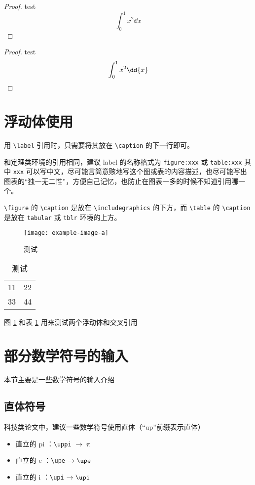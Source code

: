 \begin{proof}
  test
  \[
    \int_{0}^{1} x^2 \dd{x}
  \]
\end{proof}

\begin{proof}
  test
  \[
    \int_{0}^{1} x^2 \dd{x}  \qedhere
  \]
\end{proof}

\section{浮动体使用}

用 \verb|\label| 引用时，只需要将其放在 \verb|\caption| 的下一行即可。

和定理类环境的引用相同，建议 label 的名称格式为 \verb|figure:xxx| 或 \verb|table:xxx| 其中 \verb|xxx| 可以写中文，尽可能言简意赅地写这个图或表的内容描述，也尽可能写出图表的“独一无二性”，方便自己记忆，也防止在图表一多的时候不知道引用哪一个。

\verb|\figure| 的 \verb|\caption| 是放在 \verb|\includegraphics| 的下方，而 \verb|\table| 的 \verb|\caption| 是放在 \verb|tabular| 或 \verb|tblr| 环境的上方。

\begin{figure}[htbp]
  \centering
  \texttt{[image: example-image-a]}
  \caption{测试}
  \label{figure:test}
\end{figure}

\begin{table}[htbp]
  \centering
  \caption{测试}
  \label{table:test}
  \begin{tabular}{|c|c|}
    11 & 22 \\
    33 & 44 
  \end{tabular}
\end{table}

图 \ref{figure:test} 和表 \ref{table:test} 用来测试两个浮动体和交叉引用



\section{部分数学符号的输入}

本节主要是一些数学符号的输入介绍


\subsection{直体符号}

科技类论文中，建议一些数学符号使用直体（“up”前缀表示直体）
  \begin{itemize}
    \item 直立的 pi ：\verb|\uppi| $\to \uppi$
    \item 直立的 e ：\verb|\upe| $\to \upe$
    \item 直立的 i ：\verb|\upi| $\to \upi$
  \end{itemize}


